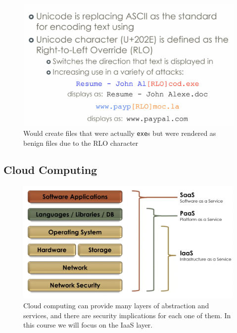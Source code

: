 \documentclass[../notes.tex]{subfiles}
\begin{document}
\begin{figure}[H]
    \centering
    \includegraphics[width=0.8\linewidth]{img/image_2023-04-03-19-37-39.png}
    \caption{Would create files that were actually \texttt{exe}s but were rendered as benign files due to the RLO character}
\end{figure}






\subsection{Cloud Computing}




\begin{figure}[H]
    \centering
    \includegraphics[width=0.8\linewidth]{img/image_2023-04-16-19-48-20.png}
    \caption{Cloud computing can provide many layers of abstraction and services, and there are security implications for each one of them. In this course we will focus on the IaaS layer.}
\end{figure}
\end{document}
